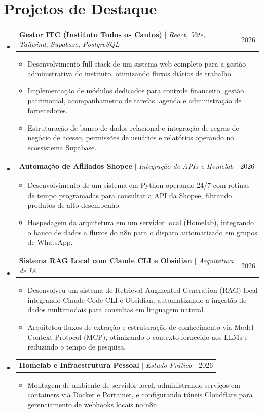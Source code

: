 \documentclass[letterpaper,11pt]{article}
\makeatletter
\newcommand{\resumeItem}[1]{
  \item\small{
    {#1 \vspace{-2pt}}
  }
}
\newcommand{\resumeProjectHeading}[2]{
    \item
    \begin{tabular*}{0.97\textwidth}{l@{\extracolsep{\fill}}r}
      \small#1 & #2 \\
    \end{tabular*}\vspace{-7pt}
}
\newcommand{\resumeSubHeadingListStart}{\begin{itemize}[leftmargin=0.15in, label={}]}
\newcommand{\resumeSubHeadingListEnd}{\end{itemize}}
\newcommand{\resumeItemListStart}{\begin{itemize}}
\newcommand{\resumeItemListEnd}{\end{itemize}\vspace{-5pt}}
\makeatother
\begin{document}
\section{Projetos de Destaque}
    \resumeSubHeadingListStart
      \resumeProjectHeading
          {\textbf{Gestor ITC (Instituto Todos os Cantos)} $|$ \emph{React, Vite, Tailwind, Supabase, PostgreSQL}}{2026}
          \resumeItemListStart
            \resumeItem{Desenvolvimento full-stack de um sistema web completo para a gestão administrativa do instituto, otimizando fluxos diários de trabalho.}
            \resumeItem{Implementação de módulos dedicados para controle financeiro, gestão patrimonial, acompanhamento de tarefas, agenda e administração de fornecedores.}
            \resumeItem{Estruturação de banco de dados relacional e integração de regras de negócio de acesso, permissões de usuários e relatórios operando no ecossistema Supabase.}
          \resumeItemListEnd

      \resumeProjectHeading
          {\textbf{Automação de Afiliados Shopee} $|$ \emph{Integração de APIs e Homelab}}{2026}
          \resumeItemListStart
            \resumeItem{Desenvolvimento de um sistema em Python operando 24/7 com rotinas de tempo programadas para consultar a API da Shopee, filtrando produtos de alto desempenho.}
            \resumeItem{Hospedagem da arquitetura em um servidor local (Homelab), integrando o banco de dados a fluxos do n8n para o disparo automatizado em grupos de WhatsApp.}
          \resumeItemListEnd
  

      \resumeProjectHeading
          {\textbf{Sistema RAG Local com Claude CLI e Obsidian} $|$ \emph{Arquitetura de IA}}{2026}
          \resumeItemListStart
            \resumeItem{Desenvolveu um sistema de Retrieval-Augmented Generation (RAG) local integrando Claude Code CLI e Obsidian, automatizando a ingestão de dados multimodais para consultas em linguagem natural.}
            \resumeItem{Arquitetou fluxos de extração e estruturação de conhecimento via Model Context Protocol (MCP), otimizando o contexto fornecido aos LLMs e reduzindo o tempo de pesquisa.}
          \resumeItemListEnd

      \resumeProjectHeading
          {\textbf{Homelab e Infraestrutura Pessoal} $|$ \emph{Estudo Prático}}{2026}
          \resumeItemListStart
            \resumeItem{Montagem de ambiente de servidor local, administrando serviços em containers via Docker e Portainer, e configurando túneis Cloudflare para gerenciamento de webhooks locais no n8n.}
          \resumeItemListEnd
    \resumeSubHeadingListEnd
\end{document}
